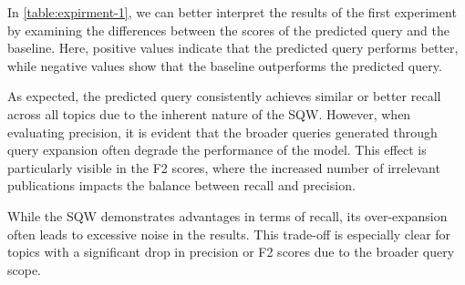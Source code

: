 In \autoref{table:expirment-1}, we can better interpret the results of the first experiment by examining the differences between the scores of the predicted query and the baseline. Here, positive values indicate that the predicted query performs better, while negative values show that the baseline outperforms the predicted query. 

As expected, the predicted query consistently achieves similar or better recall across all topics due to the inherent nature of the SQW. However, when evaluating precision, it is evident that the broader queries generated through query expansion often degrade the performance of the model. This effect is particularly visible in the F2 scores, where the increased number of irrelevant publications impacts the balance between recall and precision.

While the SQW demonstrates advantages in terms of recall, its over-expansion often leads to excessive noise in the results. This trade-off is especially clear for topics with a significant drop in precision or F2 scores due to the broader query scope.


